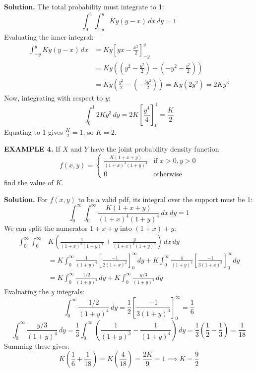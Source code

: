 \documentclass{article}
\begin{document}
\textbf{Solution.} The total probability must integrate to 1:
$$\int_{0}^{1} \int_{-y}^{y} Ky(y-x) \,dx \,dy = 1$$
Evaluating the inner integral:
\begin{align*}
\int_{-y}^{y} Ky(y-x) \,dx &= Ky \left[ yx - \frac{x^2}{2} \right]_{-y}^{y} \\
&= Ky \left( \left(y^2 - \frac{y^2}{2}\right) - \left(-y^2 - \frac{y^2}{2}\right) \right) \\
&= Ky \left( \frac{y^2}{2} - \left(-\frac{3y^2}{2}\right) \right) = Ky (2y^2) = 2Ky^3
\end{align*}
Now, integrating with respect to $y$:
$$\int_{0}^{1} 2Ky^3 \,dy = 2K \left[ \frac{y^4}{4} \right]_{0}^{1} = \frac{K}{2}$$
Equating to 1 gives $\frac{K}{2} = 1$, so $K = 2$.

\vspace{1em}

\textbf{EXAMPLE 4.} If $X$ and $Y$ have the joint probability density function
$$
f(x,y) = \begin{cases} \frac{K(1+x+y)}{(1+x)^4 (1+y)^4} & \text{if } x > 0, y > 0 \\ 0 & \text{otherwise} \end{cases}
$$
find the value of $K$.

\textbf{Solution.} For $f(x,y)$ to be a valid pdf, its integral over the support must be 1:
$$\int_{0}^{\infty} \int_{0}^{\infty} \frac{K(1+x+y)}{(1+x)^4 (1+y)^4} \,dx \,dy = 1$$
We can split the numerator $1+x+y$ into $(1+x) + y$:
\begin{align*}
\int_{0}^{\infty} \int_{0}^{\infty} & K \left( \frac{1}{(1+x)^3(1+y)^4} + \frac{y}{(1+x)^4(1+y)^4} \right) \,dx \,dy \\
&= K \int_{0}^{\infty} \frac{1}{(1+y)^4} \left[ \frac{-1}{2(1+x)^2} \right]_{0}^{\infty} dy + K \int_{0}^{\infty} \frac{y}{(1+y)^4} \left[ \frac{-1}{3(1+x)^3} \right]_{0}^{\infty} dy \\
&= K \int_{0}^{\infty} \frac{1/2}{(1+y)^4} \,dy + K \int_{0}^{\infty} \frac{y/3}{(1+y)^4} \,dy
\end{align*}
Evaluating the $y$ integrals:
$$\int_{0}^{\infty} \frac{1/2}{(1+y)^4} \,dy = \frac{1}{2} \left[ \frac{-1}{3(1+y)^3} \right]_{0}^{\infty} = \frac{1}{6}$$
$$\int_{0}^{\infty} \frac{y/3}{(1+y)^4} \,dy = \frac{1}{3} \int_{0}^{\infty} \left( \frac{1}{(1+y)^3} - \frac{1}{(1+y)^4} \right) \,dy = \frac{1}{3} \left( \frac{1}{2} - \frac{1}{3} \right) = \frac{1}{18}$$
Summing these gives:
$$K \left( \frac{1}{6} + \frac{1}{18} \right) = K \left( \frac{4}{18} \right) = \frac{2K}{9} = 1 \implies K = \frac{9}{2}$$
\end{document}
